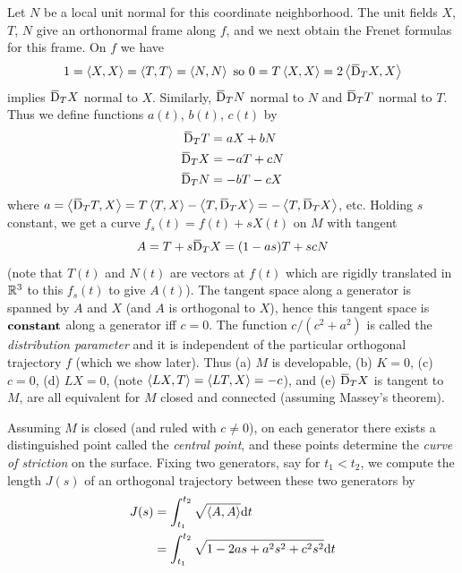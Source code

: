 \documentclass[../main]{subfiles}
\begin{document}
Let $N$ be a local unit normal for this coordinate neighborhood. The unit fields $X$, $T$, $N$ give an orthonormal frame along $f$, and we next obtain the Frenet formulas for this frame. On $f$ we have 
\[ 1 = \ip{X}{X} = \ip{T}{T} = \ip{N}{N} \text{ so } 0 = T\ip{X}{X} = 2\ip{\covariant_TX}{X} \]
implies $\covariant_TX$ normal to $X$. Similarly, $\covariant_TN$ normal to $N$ and $\covariant_TT$ normal to $T$. Thus we define functions $a(t)$, $b(t)$, $c(t)$ by
\[
\begin{aligned}
    \covariant_TT &= aX +bN\\
    \covariant_TX &= -aT+cN\\
    \covariant_TN &= -bT-cX
\end{aligned}
\]
where $a = \ip{\covariant_TT}{X} = T\ip{T}{X} - \ip{T}{\covariant_TX}=-\ip{T}{\covariant_TX}$, etc. Holding $s$ constant, we get a curve $f_s(t) = f(t) + sX(t)$ on $M$ with tangent
\[ A = T+s\covariant_TX = (1-as)T+scN \]
(note that $T(t)$ and $N(t)$ are vectors at $f(t)$ which are rigidly translated in $\bR^3$ to this $f_s(t)$ to give $A(t)$). The tangent space along a generator is spanned by $A$ and $X$ (and $A$ is orthogonal to $X$), hence this tangent space is $\emph{constant}$ along a generator iff $c=0$. The function $c/(c^2+a^2)$ is called the \emph{distribution parameter} and it is independent of the particular orthogonal trajectory $f$ (which we show later). Thus (a) $M$ is developable, (b) $K=0$, (c) $c=0$, (d) $LX = 0$, (note $\ip{LX}{T} = \ip{LT}{X}=-c$), and (e) $\covariant_TX$ is tangent to $M$, are all equivalent for $M$ closed and connected (assuming Massey's theorem).

Assuming $M$ is closed (and ruled with $c\ne 0$), on each generator there exists a distinguished point called the \emph{central point}, and these points determine the \emph{curve of striction} on the surface. Fixing two generators, say for $t_1 < t_2$, we compute the length $J(s)$ of an orthogonal trajectory between these two generators by
\[
\begin{aligned}
J(s) &= \int_{t_1}^{t_2} \sqrt{\ip{A}{A}}\dd t \\
&= \int_{t_1}^{t_2} \sqrt{1-2as+a^2s^2 + c^2s^2} \dd t
\end{aligned}
\]
\end{document}
